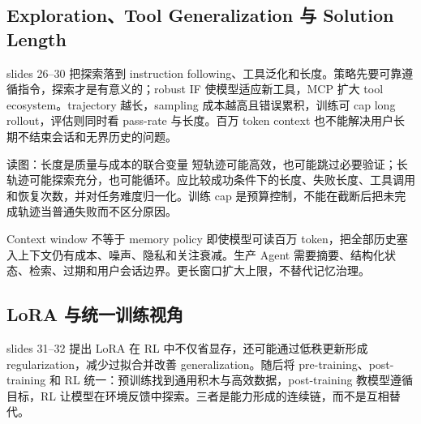 \subsection{Exploration、Tool Generalization 与 Solution Length}

slides 26--30 把探索落到 instruction following、工具泛化和长度。策略先要可靠遵循指令，探索才是有意义的；robust IF 使模型适应新工具，MCP 扩大 tool ecosystem。trajectory 越长，sampling 成本越高且错误累积，训练可 cap long rollout，评估则同时看 pass-rate 与长度。百万 token context 也不能解决用户长期不结束会话和无界历史的问题。


\begin{knowledgebox}{读图：长度是质量与成本的联合变量}
短轨迹可能高效，也可能跳过必要验证；长轨迹可能探索充分，也可能循环。应比较成功条件下的长度、失败长度、工具调用和恢复次数，并对任务难度归一化。训练 cap 是预算控制，不能在截断后把未完成轨迹当普通失败而不区分原因。
\end{knowledgebox}

\begin{warningbox}{Context window 不等于 memory policy}
即使模型可读百万 token，把全部历史塞入上下文仍有成本、噪声、隐私和关注衰减。生产 Agent 需要摘要、结构化状态、检索、过期和用户会话边界。更长窗口扩大上限，不替代记忆治理。
\end{warningbox}

\subsection{LoRA 与统一训练视角}

slides 31--32 提出 LoRA 在 RL 中不仅省显存，还可能通过低秩更新形成 regularization，减少过拟合并改善 generalization。随后将 pre-training、post-training 和 RL 统一：预训练找到通用积木与高效数据，post-training 教模型遵循目标，RL 让模型在环境反馈中探索。三者是能力形成的连续链，而不是互相替代。


